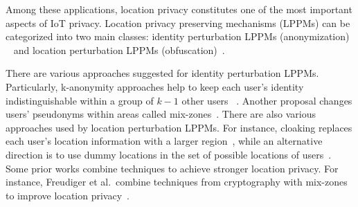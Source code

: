 Among these applications, location privacy constitutes one of the most important aspects of IoT privacy. Location privacy preserving mechanisms (LPPMs) can be categorized into two main classes:
identity perturbation LPPMs (anonymization) ~\cite{1corser2016evaluating,hoh2005protecting,freudiger2007mix, ma2009location, shokri2011quantifying, Naini2016}
and location perturbation LPPMs (obfuscation)~\cite{shokri2012protecting, gruteser2003anonymous,  bordenabe2014optimal}.

There are various approaches suggested for identity perturbation LPPMs. Particularly,  k-anonymity approaches help to keep each user's identity indistinguishable within a group of $k-1$ other users ~\cite{1corser2016evaluating,2zhang2016designing,11dewri2014exploiting, gedik2005location, zhong2009distributed, mokbel2006new, sweeney2002k, bordenabe2014optimal, kalnis2007preventing,liu2013game}. Another proposal changes users' pseudonyms within areas called mix-zones~\cite{hoh2005protecting, beresford2003location, freudiger2009optimal, beresford2003location, palanisamy2011mobimix}. There are also various approaches used by location perturbation LPPMs.  For instance, cloaking replaces each user's location information with a larger region~\cite{18shokri2014hiding,8zurbaran2015near,hoh2007preserving, gruteser2003anonymous, gedik2005location, gedik2008protecting, bordenabe2014optimal, duckham2005formal, duckham2006spatiotemporal, xue2009location, wernke2014classification, cai2015cloaking, chow2011spatial, cheng2006preserving, mokbel2006new, kalnis2006preserving, khoshgozaran2011location, bamba2008supporting, um2010advanced, zhangwei2010distributed}, while an alternative direction is to use dummy locations in the set of possible locations of users~\cite{kido2005protection, krumm2009survey, shankar2009privately, chow2009faking, kido2005anonymous, lu2008pad}.
Some prior works combine techniques to achieve stronger location privacy. For instance, Freudiger et al.\ combine techniques from cryptography with mix-zones to improve location privacy~\cite{freudiger2007mix}.




